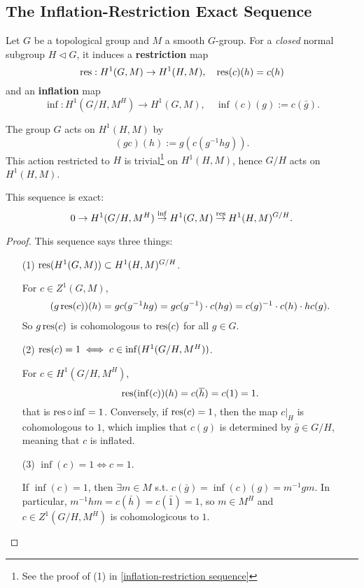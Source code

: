 \subsection{The Inflation-Restriction Exact Sequence}
Let $G$ be a topological group and $M$ a smooth $G$-group.
For a \textit{closed} normal subgroup $H\triangleleft G$, it induces a \textbf{restriction} map \[\operatorname{res} : H^1(G, M)\to H^1(H, M), \quad \operatorname{res}(c)(h) = c(h)\]
and an \textbf{inflation} map
\[\inf : H^1(G/H, M^H)\to H^1(G, M),\quad \inf(c)(g) := c(\bar g).\]

The group $G$ acts on $H^1(H, M)$ by \[(gc)(h) := g(c(g^{-1}hg)).\]
This action restricted to $H$ is trivial\footnote{
    See the proof of (1) in \cref{inflation-restriction sequence}} on $H^1(H, M)$, hence $G/H$ acts on $H^1(H, M)$.
\begin{proposition}\label{inflation-restriction sequence}
    This sequence is exact:\[
    0\to H^1(G/H, M^H)\stackrel{\inf}{\to} H^1(G, M)\stackrel{\operatorname{res}}{\to} H^1(H, M)^{G/H}.\]
\end{proposition}
\begin{proof}
    This sequence says three things:
\begin{enumerate}
\item [(1)] $\operatorname{res}(H^1(G, M))\subset H^1(H, M)^{G/H}$.\par
For $c\in Z^1(G, M)$, \begin{align*}
    (g\operatorname{res}(c))(h) = gc(g^{-1}hg)
    = gc(g^{-1})\cdot c(hg) = c(g)^{-1}\cdot c(h)\cdot hc(g).
\end{align*}
So $g\operatorname{res}(c)$ is cohomologous to $\operatorname{res}(c)$ for all $g\in G$. 
\item [(2)] $\operatorname{res}(c) = 1\iff c\in\inf(H^1(G/H, M^H))$.\par
For $c\in H^1(G/H, M^H)$, \[\operatorname{res}(\inf(c))(h) = c(\overline h) = c(1) = 1.\]
that is $\operatorname{res}\circ\inf = 1$. Conversely,
if $\operatorname{res}(c) = 1$, then the map $c|_H$ is cohomologous to $1$, which implies that $c(g)$ is determined by $\bar g\in G/H$, meaning that $c$ is inflated.
\item [(3)] $\inf(c) = 1\iff c = 1$.\par
If $\inf(c) = 1$,
then $\exists m\in M$ s.t. $c(\bar g) = \inf(c)(g) = m^{-1}gm$.
In particular, $m^{-1}hm = c(\bar h) = c(\bar{1}) = 1$, so $m\in M^H$ and $c\in Z^1(G/H, M^H)$ is cohomologicous to $1$.\qedhere
\end{enumerate}
\end{proof}


